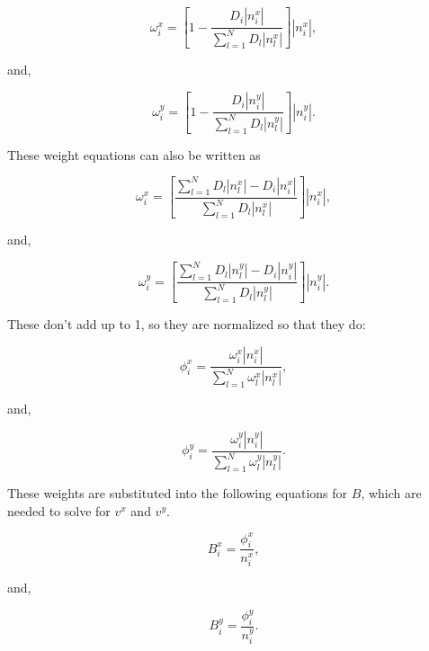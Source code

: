 \begin{equation}
\label{omegax}
\omega_i^x = \left [ 1 - \frac{D_i \left | n_i^x \right | }{\sum_{l=1}^N{} D_l  \left | n_l^x \right | } \right ] \left | n_i^x \right |,
\end{equation}

and,

\begin{equation}
\label{omegay}
\omega_i^y = \left [ 1 - \frac{D_i \left | n_i^y \right | }{\sum_{l=1}^N{} D_l  \left | n_l^y \right | } \right ] \left | n_i^y \right |.
\end{equation}

These weight equations can also be written as

\begin{equation}
\label{omegax2}
\omega_i^x = \left [ \frac{\sum_{l=1}^N D_l  \left | n_l^x \right |  - D_i \left | n_i^x \right | }{\sum_{l=1}^N D_l  \left | n_l^x \right | } \right ] \left | n_i^x \right |,
\end{equation}

and,

\begin{equation}
\label{omegay2}
\omega_i^y = \left [ \frac{\sum_{l=1}^N{} D_l  \left | n_l^y \right | - D_i \left | n_i^y \right | }{\sum_{l=1}^N{} D_l  \left | n_l^y \right | } \right ] \left | n_i^y \right |.
\end{equation}

These don't add up to 1, so they are normalized so that they do:

\begin{equation}
\label{phix}
\phi_i^x =  \frac{\omega_i^x \left | n_i^x \right | }{\sum_{l=1}^N \omega_l^x  \left | n_l^x \right | } ,
\end{equation}

and,

\begin{equation}
\label{phiy}
\phi_i^y =  \frac{\omega_i^y \left | n_i^y \right | }{\sum_{l=1}^N \omega_l^y  \left | n_l^y \right | } .
\end{equation}

These weights are substituted into the following equations for $B$, which are needed to solve for $v^x$ and $v^y$.

\begin{equation}
\label{bx}
B_i^x =  \frac{\phi_i^x }{ n_i^x } ,
\end{equation}

and,

\begin{equation}
\label{by}
B_i^y =  \frac{\phi_i^y }{ n_i^y }.
\end{equation}

